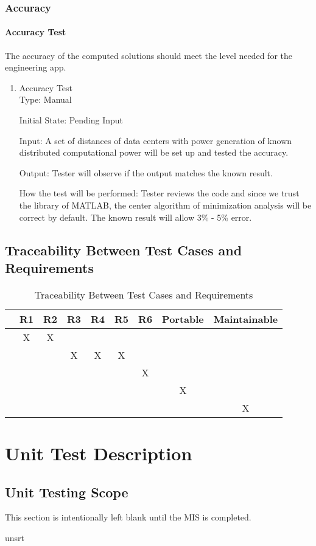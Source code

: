 \documentclass[12pt, titlepage]{article}
\begin{document}
\subsubsection{Accuracy}\label{Audst}

\paragraph{Accuracy Test}   The accuracy of the computed solutions should meet the level needed for the engineering app.

\begin{enumerate}
\item{Accuracy Test}\\

Type: Manual
					
Initial State: Pending Input
					
Input: A set of distances of data centers with power generation of known distributed computational power will be set up and tested the accuracy.
					
Output: Tester will observe if the output matches the known result.
					
How the test will be performed: Tester reviews the code and since we trust the library of MATLAB, the center algorithm of minimization analysis will be correct by default. The known result will allow 3\% - 5\% error.\textsuperscript{\cite{rivier2013electricity}}

\end{enumerate}



\subsection{Traceability Between Test Cases and Requirements}

\begin{table}[h!]
	\centering
	\begin{tabular}{|c|c|c|c|c|c|c|c|c|}
		\hline
		& R1 & R2 & R3 & R4 & R5 & R6 & Portable & Maintainable \\
		\hline
		\nameref{Ainput}    &X&X& & & & & & \\ \hline
		\nameref{Aoutput}   & & &X&X&X& & & \\ \hline
		\nameref{Aport}     & & & & & &X& & \\ \hline
		\nameref{Amaintain} & & & & & & &X& \\ \hline
		\nameref{Audst}     & & & & & & & &X\\ \hline
	\end{tabular}
	\caption{Traceability Between Test Cases and Requirements}
	\label{Table:A_trace}
\end{table}
\newpage
\section{Unit Test Description}
\label{unittest}

\subsection{Unit Testing Scope}

This section is intentionally left blank until the MIS is completed.

\newpage

 {unsrt}

\end{document}
